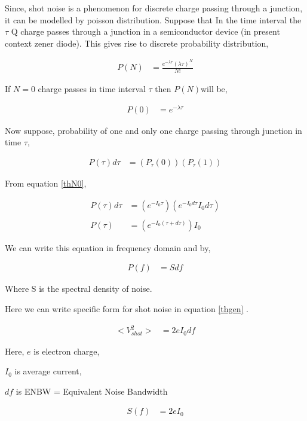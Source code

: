 \documentclass[12pt]{article}
\begin{document}
Since, shot noise is a phenomenon for discrete charge passing through a junction, it can be modelled by poisson distribution. Suppose that In the time interval the $\tau$ Q charge passes through a junction in a semiconductor device (in present context zener diode). This gives rise to discrete probability distribution,

\begin{align}
P(N) & = \frac{e^{-\lambda \tau}(\lambda \tau)^{N}}{N!}
\end{align}

If $N=0$ charge passes in time interval $\tau$ then $P(N)$will be,

\begin{align} \label{eqN0}
P(0) & = e^{-\lambda \tau}
\end{align}

Now suppose, probability of one and only one charge passing through junction in time $\tau$,

\begin{align*}
P(\tau)d\tau & = (P_{\tau}(0))(P_{\tau}(1))
\end{align*}

From equation \ref{thN0},


\begin{align*}
P(\tau)d\tau & = (e^{-I_0 \tau})(e^{-I_0 d\tau} I_0 d\tau)\\
\\  
P(\tau) & = (e^{-I_0 (\tau + d\tau)}) I_0
\end{align*}

We can write this equation in frequency domain and by,

\begin{align}\label{thgenl}
P(f) & = S df
\end{align}

Where S is the spectral density of noise.

Here we can write specific form for shot noise in equation \ref{thgen} \cite{campbell}.

\begin{align}\label{thshotvo}
<V_{shot}^2> & = 2 e I_0 df
\end{align}

Here, $e$ is electron charge,

$I_0$ is average current,

$df$ is ENBW = Equivalent Noise Bandwidth

\begin{align}\label{thshots}
S(f) & = 2 e I_0
\end{align}
\end{document}
